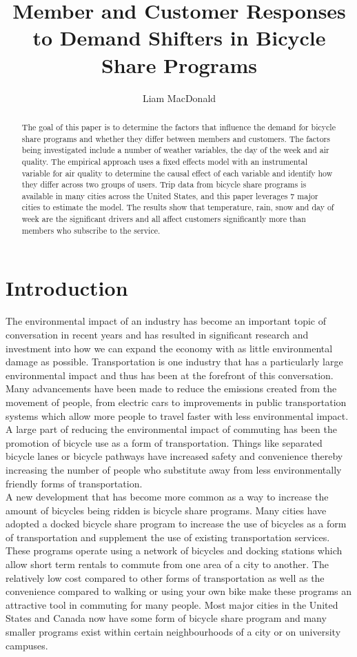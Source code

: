 \documentclass[12pt,letter paper]{article}
\title{Member and Customer Responses to Demand Shifters in Bicycle Share Programs}
\author{Liam MacDonald}
\begin{document}
\maketitle
\begin{abstract}
The goal of this paper is to determine the factors that influence the demand for bicycle share programs and whether they differ between members and customers.  The factors being investigated include a number of weather variables, the day of the week and air quality.  The empirical approach uses a fixed effects model with an instrumental variable for air quality to determine the causal effect of each variable and identify how they differ across two groups of users.  Trip data from bicycle share programs is available in many cities across the United States, and this paper leverages 7 major cities to estimate the model.  The results show that temperature, rain, snow and day of week are the significant drivers and all affect customers significantly more than members who subscribe to the service.
\end{abstract}



\section{Introduction}

The environmental impact of an industry has become an important topic of conversation in recent years and has resulted in significant research and investment into how we can expand the economy with as little environmental damage as possible.  Transportation is one industry that has a particularly large environmental impact and thus has been at the forefront of this conversation.  Many advancements have been made to reduce the emissions created from the movement of people, from electric cars to improvements in public transportation systems which allow more people to travel faster with less environmental impact.  A large part of reducing the environmental impact of commuting has been the promotion of bicycle use as a form of transportation.  Things like separated bicycle lanes or bicycle pathways have increased safety and convenience thereby increasing the number of people who substitute away from less environmentally friendly forms of transportation. \\

A new development that has become more common as a way to increase the amount of bicycles being ridden is bicycle share programs.  Many cities have adopted a docked bicycle share program to increase the use of bicycles as a form of transportation and supplement the use of existing transportation services.  These programs operate using a network of bicycles and docking stations which allow short term rentals to commute from one area of a city to another.  The relatively low cost compared to other forms of transportation as well as the convenience compared to walking or using your own bike make these programs an attractive tool in commuting for many people.  Most major cities in the United States and Canada now have some form of bicycle share program and many smaller programs exist within certain neighbourhoods of a city or on university campuses. \\
\end{document}
